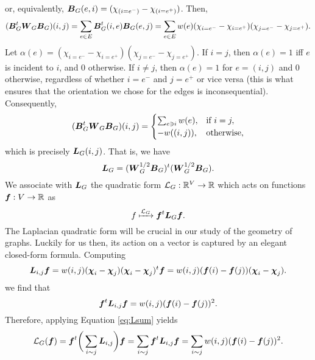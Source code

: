 or, equivalently, $\vb*{B}_G(e,i) = (\chi_{(i=e^-)}-\chi_{(i=e^+)})$. Then,
\begin{equation*}
   ( \vb*{B}_G^t\vb*{W}_G\vb*{B}_G)(i,j)=\sum_{e\in E} \vb*{B}_G^t(i,e)\vb*{B}_G(e,j)=\sum_{e\in E}w(e)(\chi_{i=e^-}-\chi_{i=e^+})(\chi_{j=e^-}-\chi_{j=e^+}).
\end{equation*}
Let $\alpha(e)=(\chi_{i=e^-}-\chi_{i=e^+})(\chi_{j=e^-}-\chi_{j=e^+})$. If $i=j$, then $\alpha(e)=1$ iff $e$ is incident to $i$, and 0 otherwise. If $i\neq j$, then $\alpha(e)=1$ for $e=(i,j)$ and 0 otherwise, regardless of whether $i=e^-$ and $j=e^+$ or vice versa (this is what ensures that the orientation we chose for the edges is inconsequential). Consequently, 
\begin{align*}
(\vb*{B}_G^t\vb*{W}_G\vb*{B}_G)(i,j) = 
\begin{cases}
\sum_{e\ni i} w(e),&\text{if } i=j,\\
-w((i,j)),&\text{otherwise}, 
\end{cases}
\end{align*}
which is precisely $\vb*{L}_G(i,j)$. That is, we have 
 \begin{equation}
 \label{eq:L=BTB}
 \vb*{L}_G=(\vb*{W}_G^{1/2}\vb*{B}_G)^t(\vb*{W}_G^{1/2}\vb*{B}_G).
 \end{equation}
 We associate with $\vb*{L}_G$ the quadratic form $\mathcal{L}_G:\mathbb{R}^V\to \mathbb{R}$ which acts on functions $\vb*{f}:V\to \mathbb{R}$ as 
\begin{equation*}
 f\xmapsto{\mathcal{L}_G} \vb*{f}^t \vb*{L}_G \vb*{f}.
\end{equation*}
The Laplacian quadratic form will be crucial in our study of the geometry of graphs. Luckily for us then, its action on a vector is captured by an elegant closed-form formula. 
Computing 
\begin{equation*}
    \vb*{L}_{i,j}\vb*{f} = w(i,j)(\boldsymbol{\chi}_i -\boldsymbol{\chi}_j)(\boldsymbol{\chi}_i-\boldsymbol{\chi}_j)^t \vb*{f} = w(i,j)(\vb*{f}(i)-\vb*{f}(j))(\boldsymbol{\chi}_i-\boldsymbol{\chi}_j).
\end{equation*}
we find that 
\[\vb*{f}^t \vb*{L}_{i,j} \vb*{f} = w(i,j)(\vb*{f}(i)-\vb*{f}(j))^2.\]
Therefore, applying Equation \ref{eq:Lsum} yields 
\begin{equation}
\label{eq:Lf}
    \mathcal{L}_G(\vb*{f}) = \vb*{f}^t \bigg(\sum_{i\sim j} \vb*{L}_{i,j}\bigg) \vb*{f} = \sum_{i\sim j}\vb*{f}^t \vb*{L}_{i,j} \vb*{f}= \sum_{i\sim j} w(i,j)(\vb*{f}(i)-\vb*{f}(j))^2.
\end{equation}

